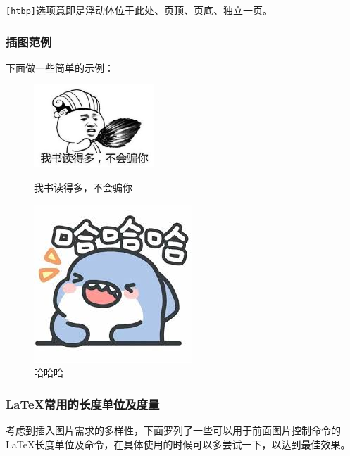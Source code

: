 \verb|[htbp]|选项意即是浮动体位于此处、页顶、页底、独立一页。

\subsubsection{插图范例}

下面做一些简单的示例：

\begin{figure}[!htb]
  \begin{minipage}[t]{0.5\linewidth}
    \centering
     \includegraphics[width=0.4\textwidth]{figures/images1.jpg}
     \caption{我书读得多，不会骗你}\label{fig:1}
  \end{minipage}%
  \begin{minipage}[t]{0.5\linewidth}
    \centering
    \includegraphics[scale=0.5,angle=-45]{figures/images2.jpg}
    \caption{哈哈哈}\label{fig:2}
  \end{minipage}
\end{figure}

\subsubsection{\LaTeX 常用的长度单位及度量}

考虑到插入图片需求的多样性，下面罗列了一些可以用于前面图片控制命令的\LaTeX 长度单位及命令，在具体使用的时候可以多尝试一下，以达到最佳效果。

